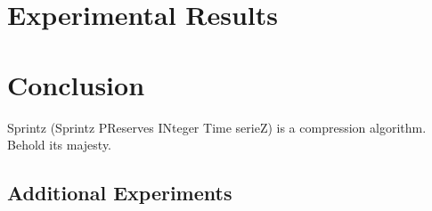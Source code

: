 \documentclass{vldb}
\begin{document}


\section{Experimental Results} \label{sec:results}



\section{Conclusion} \label{sec:conclusion}

Sprintz (Sprintz PReserves INteger Time serieZ) is a compression algorithm. Behold its majesty.

\begin{appendix}
\section{Additional Experiments} \label{sec:moreResults}



\end{appendix}
\vspace{-1mm}


% 


\end{document}
